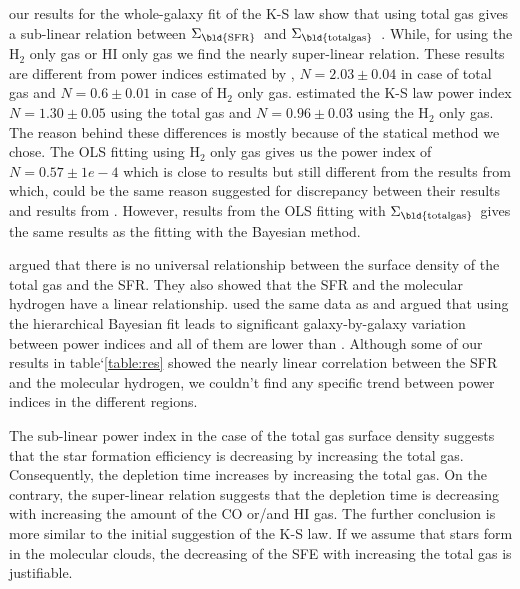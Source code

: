 \documentclass[useAMS,usenatbib]{mn2e}
\newcommand \sigmatotalgas {$\Sigma_{\rm \bld {total gas }} $\ }
\newcommand \sigmasfr     {$\Sigma_{\rm \bld {SFR }} $\ }
\begin{document}
our results for the whole-galaxy fit of the K-S law show that using total gas gives a sub-linear relation between \sigmasfr and \sigmatotalgas. While, for using the H$_{2}$ only gas or HI only gas we find the nearly super-linear relation. These results are different from power indices estimated by \cite{Ford13}, $N=2.03\pm0.04$ in case of total gas and $N=0.6\pm0.01$ in case of H$_{2}$ only gas. \cite{Tabatabaei10} estimated the K-S law power index $N=1.30\pm0.05$ using the total gas and $N=0.96\pm0.03$ using the H$_{2}$ only gas. The reason behind these differences is mostly because of the statical method we chose. The OLS fitting using H$_{2}$ only gas gives us the power index of $N=0.57\pm1e-4$ which is close to \cite{Ford13} results but still different from the results from \cite{Tabatabaei10} which, could be the same reason \cite{Ford13} suggested for discrepancy between their results and results from \cite{Tabatabaei10}. However, results from the OLS fitting with \sigmatotalgas gives the same results as the fitting with the Bayesian method.%

 \cite{Bigiel08} argued that there is no universal relationship between the surface density of the total gas and the SFR. They also showed that the SFR and the molecular hydrogen have a linear relationship. \cite{Shetty13} used the same data as \cite{Bigiel08} and argued that using the hierarchical Bayesian fit leads to significant galaxy-by-galaxy variation between power indices and all of them are lower than \cite{Bigiel08}. Although some of our results in table`\ref{table:res} showed the nearly linear correlation between the SFR and the molecular hydrogen, we couldn't find any specific trend between power indices in the different regions. 

The sub-linear power index in the case of the total gas surface density suggests that the star formation efficiency is decreasing by increasing the total gas. Consequently, the depletion time increases by increasing the total gas. On the contrary, the super-linear relation suggests that the depletion time is decreasing with increasing the amount of the CO or/and HI gas. The further conclusion is more similar to the initial suggestion of the K-S law. If we assume that stars form in the molecular clouds, the decreasing of the SFE with increasing the total gas is justifiable.  
\end{document}
